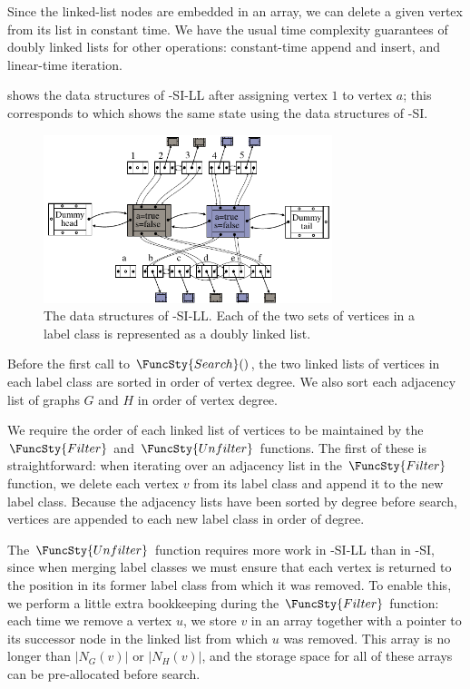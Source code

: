 Since the linked-list nodes are embedded in an array, we can delete a given
vertex from its list in constant time.  We have the usual time complexity
guarantees of doubly linked lists for other operations: constant-time
append and insert, and linear-time iteration.

shows the data structures of \McSplit-SI-LL after assigning vertex $1$ to vertex $a$;
this corresponds to  which shows the same state
using the data structures of \McSplit-SI.

\begin{figure}[htb]
    \centering
    \includegraphics*[width=0.75\textwidth]{14b-mcsplit-induced-si/figs/data-structure-step-1-ll-version}
    \caption{The data structures of \McSplit-SI-LL. Each of the two sets of vertices in a label
        class is represented as a doubly linked list.}
    \label{figure:si-data-structures-ll-version}
\end{figure}

Before the first call to $\FuncSty{Search}()$, the two linked lists of vertices in
each label class are sorted in order of vertex degree.  We also sort each adjacency list
of graphs $G$ and $H$ in order of vertex degree.

We require the order of each linked list of vertices to be maintained
by the $\FuncSty{Filter}$ and $\FuncSty{Unfilter}$ functions.  The first of these is straightforward:
when iterating over an adjacency list in the $\FuncSty{Filter}$ function, we delete each vertex $v$
from its label class and append it to the new label class.  Because the adjacency lists have been sorted
by degree before search, vertices are appended to each new label class in order of degree.

The $\FuncSty{Unfilter}$ function requires more work in \McSplit-SI-LL than in \McSplit-SI,
since when merging label classes we must ensure that each vertex is returned to the position
in its former label class from which it was removed.  To enable this, we perform a little extra
bookkeeping during the $\FuncSty{Filter}$ function: each time we remove a vertex $u$, we store
$v$ in an array together with a pointer to its successor node in the linked list from which $u$
was removed.  This array is no longer than $|N_G(v)|$ or $|N_H(v)|$, and the storage
space for all of these arrays can be pre-allocated before search.

